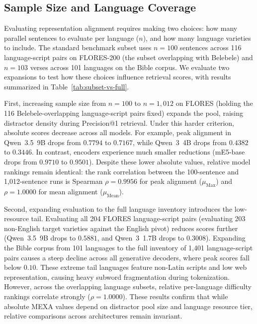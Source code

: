 \subsection{Sample Size and Language Coverage}
\label{subsec:results-sample-size-coverage}

Evaluating representation alignment requires making two choices: how many parallel sentences to evaluate per language ($n$), and how many language varieties to include. The standard benchmark subset uses $n = 100$ sentences across 116 language-script pairs on FLORES-200 (the subset overlapping with Belebele) and $n = 103$ verses across 101 languages on the Bible corpus. We evaluate two expansions to test how these choices influence retrieval scores, with results summarized in Table~\ref{tab:subset-vs-full}.

First, increasing sample size from $n = 100$ to $n = 1{,}012$ on FLORES (holding the 116 Belebele-overlapping language-script pairs fixed) expands the pool, raising distractor density during Precision@1 retrieval. Under this harder criterion, absolute scores decrease across all models. For example, peak alignment in Qwen~3.5~9B drops from $0.7794$ to $0.7167$, while Qwen~3~4B drops from $0.4382$ to $0.3446$. In contrast, encoders experience much smaller reductions (mE5-base drops from $0.9710$ to $0.9501$). Despite these lower absolute values, relative model rankings remain identical: the rank correlation between the 100-sentence and 1,012-sentence runs is Spearman $\rho = 0.9956$ for peak alignment ($\mu_{\text{Max}}$) and $\rho = 1.0000$ for mean alignment ($\mu_{\text{Mean}}$).

Second, expanding evaluation to the full language inventory introduces the low-resource tail. Evaluating all 204 FLORES language-script pairs (evaluating 203 non-English target varieties against the English pivot) reduces scores further (Qwen~3.5~9B drops to $0.5881$, and Qwen~3~1.7B drops to $0.3008$). Expanding the Bible corpus from 101 languages to the full inventory of 1,401 language-script pairs causes a steep decline across all generative decoders, where peak scores fall below $0.10$. These extreme tail languages feature non-Latin scripts and low web representation, causing heavy subword fragmentation during tokenization. However, across the overlapping language subsets, relative per-language difficulty rankings correlate strongly ($\rho = 1.0000$). These results confirm that while absolute MEXA values depend on distractor pool size and language resource tier, relative comparisons across architectures remain invariant.

